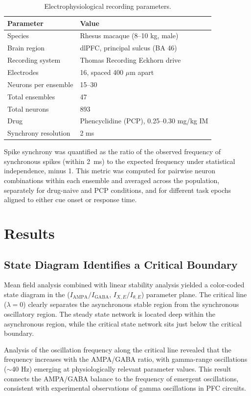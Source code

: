 \documentclass[11pt]{article}
\begin{document}
\begin{table}[htbp]
\centering
\caption{Electrophysiological recording parameters.}
\label{tab:recording}
\begin{tabular}{ll}
\toprule
Parameter & Value \\
\midrule
Species & Rhesus macaque (8--10 kg, male) \\
Brain region & dlPFC, principal sulcus (BA 46) \\
Recording system & Thomas Recording Eckhorn drive \\
Electrodes & 16, spaced 400 $\mu$m apart \\
Neurons per ensemble & 15--30 \\
Total ensembles & 47 \\
Total neurons & 893 \\
Drug & Phencyclidine (PCP), 0.25--0.30 mg/kg IM \\
Synchrony resolution & 2 ms \\
\bottomrule
\end{tabular}
\end{table}

Spike synchrony was quantified as the ratio of the observed frequency of synchronous spikes (within 2~ms) to the expected frequency under statistical independence, minus 1. This metric was computed for pairwise neuron combinations within each ensemble and averaged across the population, separately for drug-naive and PCP conditions, and for different task epochs aligned to either cue onset or response time.

\section{Results}

\subsection{State Diagram Identifies a Critical Boundary}

Mean field analysis combined with linear stability analysis yielded a color-coded state diagram in the ($I_\text{AMPA}/I_\text{GABA}$, $I_{X,E}/I_{\theta,E}$) parameter plane. The critical line ($\lambda = 0$) clearly separates the asynchronous stable region from the synchronous oscillatory region. The steady state network is located deep within the asynchronous region, while the critical state network sits just below the critical boundary.

Analysis of the oscillation frequency along the critical line revealed that the frequency increases with the AMPA/GABA ratio, with gamma-range oscillations ($\sim$40 Hz) emerging at physiologically relevant parameter values. This result connects the AMPA/GABA balance to the frequency of emergent oscillations, consistent with experimental observations of gamma oscillations in PFC circuits.
\end{document}
